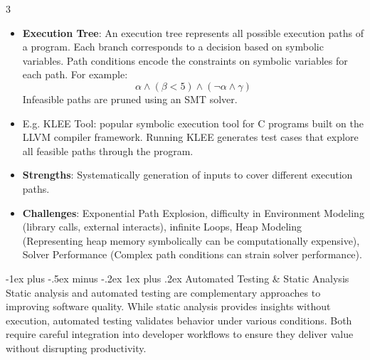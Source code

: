 \documentclass[a4paper, 10pt, landscape]{article}
\makeatletter
\renewcommand{\subsubsection}{\@startsection{subsubsection}{3}{0mm}%
                                {-1ex plus -.5ex minus -.2ex}%
                                {1ex plus .2ex}%
                                {\normalfont\small\bfseries}}
\makeatother
\begin{document}
\begin{multicols*}{3}
\begin{itemize}
\item \textbf{Execution Tree}: An execution tree represents all possible execution paths of a program. Each branch corresponds to a decision based on symbolic variables. Path conditions encode the constraints on symbolic variables for each path. For example:
        \[
        \alpha \land (\beta < 5) \land (\neg\alpha \land \gamma)
        \]
Infeasible paths are pruned using an SMT solver.
\item E.g. KLEE Tool: popular symbolic execution tool for C programs built on the LLVM compiler framework. Running KLEE generates test cases that explore all feasible paths through the program.
\item \textbf{Strengths}: Systematically generation of inputs to cover different execution paths.
 \item \textbf{Challenges}: Exponential Path Explosion, difficulty in Environment Modeling (library calls, external interacts), infinite Loops, Heap Modeling (Representing heap memory symbolically can be computationally expensive), Solver Performance (Complex path conditions can strain solver performance).
\end{itemize}




\subsubsection{Automated Testing \& Static Analysis}
Static analysis and automated testing are complementary approaches to improving software quality. While static analysis provides insights without execution, automated testing validates behavior under various conditions. Both require careful integration into developer workflows to ensure they deliver value without disrupting productivity.










\end{multicols*}
\end{document}
